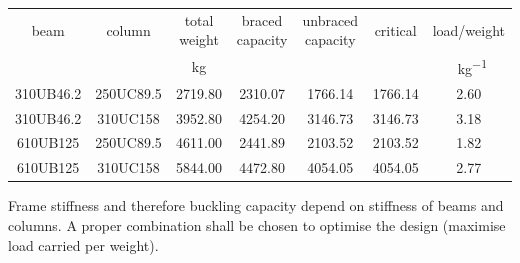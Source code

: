 \begin{solution}
\begin{table}[H]
\begin{tabular}{ccccccc}
	\toprule
	  beam    &  column   &  total weight  & braced capacity & unbraced capacity & critical &      load/weight      \\
	          &           & \si{\kilogram} &    \si{\kn}     &     \si{\kn}      & \si{\kn} & \si{\kn\per\kilogram} \\ \midrule
	310UB46.2 & 250UC89.5 &    2719.80     &     2310.07     &      1766.14      & 1766.14  &         2.60          \\
	310UB46.2 & 310UC158  &    3952.80     &     4254.20     &      3146.73      & 3146.73  &         3.18          \\
	610UB125  & 250UC89.5 &    4611.00     &     2441.89     &      2103.52      & 2103.52  &         1.82          \\
	610UB125  & 310UC158  &    5844.00     &     4472.80     &      4054.05      & 4054.05  &         2.77          \\ \bottomrule
\end{tabular}
\end{table}

Frame stiffness and therefore buckling capacity depend on stiffness of beams and columns. A proper combination shall be chosen to optimise the design (maximise load carried per weight).
\end{solution}
